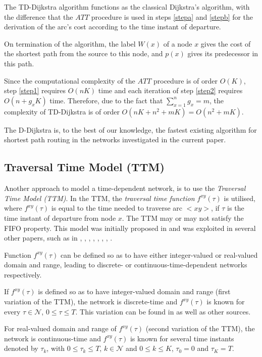 \documentclass[conference]{IEEEtran}
\begin{document}
The TD-Dijkstra algorithm functions as the classical Dijkstra's algorithm, with the difference that the $ATT$ procedure is used in steps \ref{stepa} and \ref{stepb} for the derivation of the arc's cost according to the time instant of departure.   

On termination of the algorithm, the label $W(x)$ of a node $x$  gives the cost of the shortest path from the source to this node, and $p(x)$ gives its predecessor in this path.

Since the computational complexity of the $ATT$ procedure is of order $O(K)$, step \ref{step1} requires $O(nK)$ time and each iteration of step \ref{step2} requires $O(n+g_xK)$ time. Therefore, due to the fact that $\sum_{x=1}^{n}g_x=m$,  the complexity of TD-Dijkstra is of order  $O(nK+n^2+mK)=O(n^2+mK)$.

The D-Dijkstra is, to the best of our knowledge, the fastest existing algorithm for shortest path routing in the networks investigated in the current paper. 


\subsection{Traversal Time Model (TTM)} \label{ttm} 

Another approach to model a time-dependent network, is to use the \emph{Traversal Time Model (TTM)}. In the TTM, the \emph{traversal time function} $f^{xy}(\tau)$ is utilised, where $f^{xy}(\tau)$ is equal to the time needed to traverse arc $<xy>$, if $\tau$ is the time instant of departure from node $x$. The TTM may or may not satisfy the FIFO property. This model was initially proposed in \cite{Cooke} and was exploited in several other papers, such as in \cite{Delling}, \cite{Nannicini}, \cite{Delling2}, \cite{Delling3}, \cite{Delling4}, \cite{Ding}, \cite{Batz}, \cite{Chabini}. 




Function $f^{xy}(\tau)$ can be defined so as to have either integer-valued or real-valued domain and range, leading to discrete- or continuous-time-dependent networks respectively.

If $f^{xy}(\tau)$ is defined so as to have integer-valued domain and range (first variation of the TTM), the network is discrete-time and $f^{xy}(\tau)$ is known for every $\tau \in \mathcal{N}$, $0\leq \tau \leq T$. This variation can be found in \cite{Chabini} as well as other sources.

For real-valued domain and range of $f^{xy}(\tau)$ (second variation of the TTM), the network is continuous-time and $f^{xy}(\tau)$ is known for several time instants denoted by $\tau_k$, with $0\leq \tau_k \leq T$, $k \in \mathcal{N}$ and $0 \leq k \leq K$, $\tau_0=0$ and $\tau_K=T$.
\end{document}
